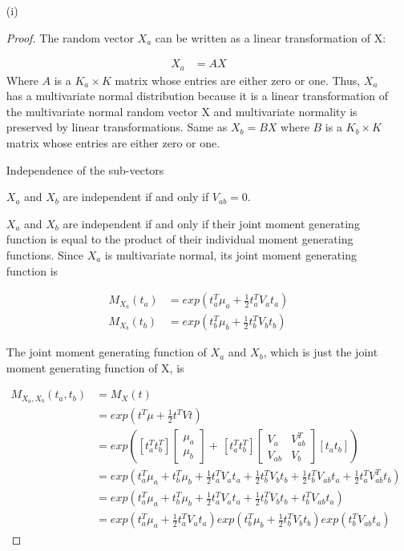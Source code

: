 \begin{itemize}

\item[(i)] 
\begin{proof}

The random vector $X_a$ can be written as a linear transformation of X:

\begin{align*}
	X_a &= A X
\end{align*}
Where $A$ is a $K_a \times K$ matrix whose entries are either zero or one. Thus, $X_a $ has a multivariate normal distribution because it is a linear transformation of the multivariate normal random vector X and multivariate normality is preserved by linear transformations. Same as $X_b = B X$ where $B$ is a $K_b \times K$ matrix whose entries are either zero or one. 

Independence of the sub-vectors

$X_a$ and $X_b$ are independent if and only if $V_{ab} = 0$.

$X_a$ and $X_b$ are independent if and only if their joint moment generating function is equal to the product of their individual moment generating functions. Since $X_a$ is multivariate normal, its joint moment generating function is 

\begin{align*}
	M_{X_a}(t_a) &= exp(t^T_a \mu_a + \frac{1}{2} t_a^T V_a t_a) \\
	M_{X_b}(t_b) &= exp(t^T_b \mu_b + \frac{1}{2} t_b^T V_b t_b) 
\end{align*}

The joint moment generating function of $X_a$ and $X_b$, which is just the joint moment generating function of X, is

\begin{align*}
	M_{X_a, X_b}(t_a, t_b) &= M_{X}(t) \\
	&= exp(t^T \mu + \frac{1}{2} t^T V t) \\
	&= exp \left( [t_a^T t_b^T] \begin{bmatrix}
		\mu_a \\
		\mu_b
	\end{bmatrix} + \frac{}{} [t_a^T t_b^T] \begin{bmatrix}
	V_a & V_{ab}^T \\
	V_{ab} & V_b
\end{bmatrix} [t_a t_b] \right) \\
&= exp \left( t_a^T \mu_a + t_b^T \mu_b + \frac{1}{2} t_a^T V_a t_a + \frac{1}{2} t_b^T V_b t_b + \frac{1}{2} t_b^T V_{ab} t_a + \frac{1}{2} t_a^T V_{ab}^T t_b \right) \\
&= exp \left( t_a^T \mu_a + t_b^T \mu_b + \frac{1}{2} t_a^T V_a t_a + \frac{1}{2} t_b^T V_b t_b +  t_b^T V_{ab} t_a  \right) \\
&= exp \left( t_a^T \mu_a + \frac{1}{2} t_a^T V_a t_a \right) exp \left( t_b^T \mu_b + \frac{1}{2} t_b^T V_b t_b \right) exp( t_b^T V_{ab} t_a)
\end{align*}


\end{proof}
\end{itemize}
